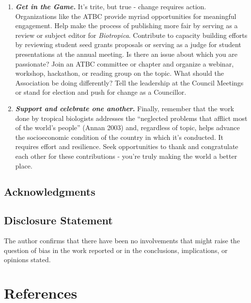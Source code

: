 \documentclass[
  12pt,
  man, donotrepeattitle]{apa6}
\begin{document}
\begin{enumerate}
\item
  \textbf{\emph{Get in the Game.}} It's trite, but true - change requires action. Organizations like the ATBC provide myriad opportunities for meaningful engagement. Help make the process of publishing more fair by serving as a review or subject editor for \emph{Biotropica}. Contribute to capacity building efforts by reviewing student seed grants proposals or serving as a judge for student presentations at the annual meeting. Is there an issue about which you are passionate? Join an ATBC committee or chapter and organize a webinar, workshop, hackathon, or reading group on the topic. What should the Association be doing differently? Tell the leadership at the Council Meetings or stand for election and push for change as a Councillor.
\item
  \textbf{\emph{Support and celebrate one another}.} Finally, remember that the work done by tropical biologists addresses the ``neglected problems that afflict most of the world's people'' (Annan 2003) and, regardless of topic, helps advance the socioeconomic condition of the country in which it's conducted. It requires effort and resilience. Seek opportunities to thank and congratulate each other for these contributions - you're truly making the world a better place.
\end{enumerate}

\hypertarget{acknowledgments}{%
\subsection{Acknowledgments}\label{acknowledgments}}

\hypertarget{disclosure-statement}{%
\subsection{Disclosure Statement}\label{disclosure-statement}}

The author confirms that there have been no involvements that might raise the question of bias in the work reported or in the conclusions, implications, or opinions stated.

\newpage

\hypertarget{references}{%
\section{References}\label{references}}
\end{document}
